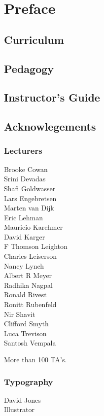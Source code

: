 \chapter*{Preface}


\section*{Curriculum}

\section*{Pedagogy}

\section*{Instructor's Guide}

\section*{Acknowlegements}

\subsection*{Lecturers}

Brooke Cowan\\
Srini Devadas\\
Shafi Goldwasser\\
Lars Engebretsen\\
Marten van Dijk\\
Eric Lehman\\
Mauricio Karchmer\\
David Karger\\
F Thomson Leighton\\
Charles Leiserson\\
Nancy Lynch\\
Albert R Meyer\\
Radhika Nagpal\\
Ronald Rivest\\
Ronitt Rubenfeld\\
Nir Shavit\\
Clifford Smyth\\
Luca Trevison\\
Santosh Vempala

More than 100 TA's.

\subsection*{Typography}

David Jones\\
Illustrator

\endinput

